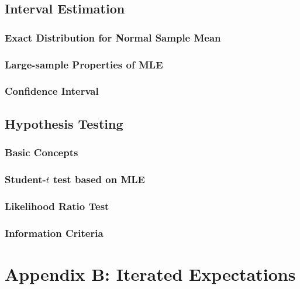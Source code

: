 \documentclass[]{book}
\theoremstyle{definition}
\theoremstyle{definition}
\theoremstyle{definition}
\theoremstyle{remark}
\begin{document}
\section{Interval Estimation}\label{S:AppA:IE}

\subsection{Exact Distribution for Normal Sample
Mean}\label{S:AppA:IE:ED}

\subsection{Large-sample Properties of
MLE}\label{large-sample-properties-of-mle}

\subsection{Confidence Interval}\label{confidence-interval}

\section{Hypothesis Testing}\label{S:AppA:HT}

\subsection{Basic Concepts}\label{basic-concepts}

\subsection{\texorpdfstring{Student-\(t\) test based on
MLE}{Student-t test based on MLE}}\label{student-t-test-based-on-mle}

\subsection{Likelihood Ratio Test}\label{S:AppA:HT:LRT}

\subsection{Information Criteria}\label{S:AppA:HT:IC}

\chapter{Appendix B: Iterated Expectations}\label{C:AppB}
\end{document}

